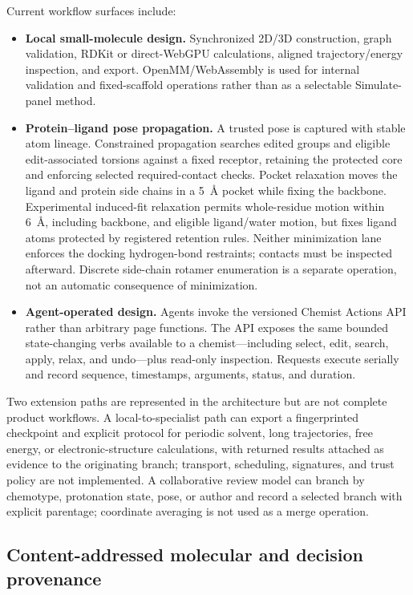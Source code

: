 \documentclass[11pt]{article}
\begin{document}
\begin{small}
Current workflow surfaces include:

\begin{itemize}[leftmargin=*]
\item \textbf{Local small-molecule design.} Synchronized 2D/3D construction, graph validation, RDKit or direct-WebGPU calculations, aligned trajectory/energy inspection, and export. OpenMM/WebAssembly is used for internal validation and fixed-scaffold operations rather than as a selectable Simulate-panel method.
\item \textbf{Protein--ligand pose propagation.} A trusted pose is captured with stable atom lineage. Constrained propagation searches edited groups and eligible edit-associated torsions against a fixed receptor, retaining the protected core and enforcing selected required-contact checks. Pocket relaxation moves the ligand and protein side chains in a 5~\AA{} pocket while fixing the backbone. Experimental induced-fit relaxation permits whole-residue motion within 6~\AA{}, including backbone, and eligible ligand/water motion, but fixes ligand atoms protected by registered retention rules. Neither minimization lane enforces the docking hydrogen-bond restraints; contacts must be inspected afterward. Discrete side-chain rotamer enumeration is a separate operation, not an automatic consequence of minimization.
\item \textbf{Agent-operated design.} Agents invoke the versioned Chemist Actions API rather than arbitrary page functions. The API exposes the same bounded state-changing verbs available to a chemist---including select, edit, search, apply, relax, and undo---plus read-only inspection. Requests execute serially and record sequence, timestamps, arguments, status, and duration.
\end{itemize}

Two extension paths are represented in the architecture but are not complete product workflows. A local-to-specialist path can export a fingerprinted checkpoint and explicit protocol for periodic solvent, long trajectories, free energy, or electronic-structure calculations, with returned results attached as evidence to the originating branch; transport, scheduling, signatures, and trust policy are not implemented. A collaborative review model can branch by chemotype, protonation state, pose, or author and record a selected branch with explicit parentage; coordinate averaging is not used as a merge operation.

\subsection{Content-addressed molecular and decision provenance}


\end{small}
\end{document}
